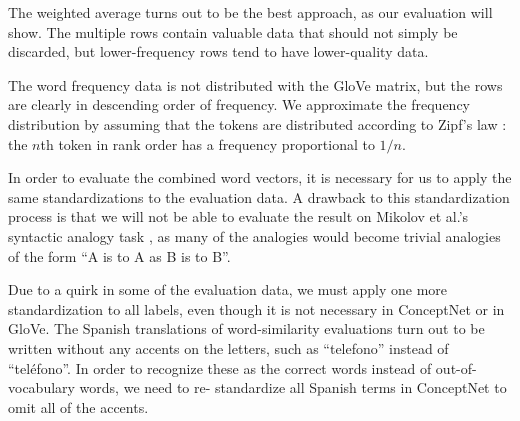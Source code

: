\documentclass[letterpaper]{article}
\begin{document}
The weighted average turns out to be the best approach, as our evaluation will
show. The multiple rows contain valuable data that should not simply be
discarded, but lower-frequency rows tend to have lower-quality data.

The word frequency data is not distributed with the GloVe matrix, but
the rows are clearly in descending order of frequency. We approximate the
frequency distribution by assuming that the tokens are distributed according to
Zipf's law \cite{zipf1949human}: the $n$th token in rank order has a frequency
proportional to $1/n$.

In order to evaluate the combined word vectors, it is necessary for us to apply
the same standardizations to the evaluation data. A drawback to this
standardization process is that we will not be able to evaluate the result on
Mikolov et al.'s syntactic analogy task \cite{mikolov2013word2vec}, as many of
the analogies would become trivial analogies of the form
``A is to A as B is to B''.

Due to a quirk in some of the evaluation data, we must apply one more
standardization to all labels, even though it is not necessary in ConceptNet or
in GloVe. The Spanish translations of word-similarity evaluations
\cite{hassan2009crosslingual} turn out to be written without any accents on the
letters, such as ``telefono'' instead of ``tel\'{e}fono''. In order to recognize
these as the correct words instead of out-of-vocabulary words, we need to re-
standardize all Spanish terms in ConceptNet to omit all of the accents.

\end{document}
